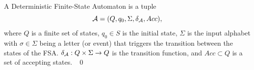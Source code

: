 \documentclass{ifacconf}
\newcommand{\red}[1]{{\color{red} #1}}
\begin{document}
% 

\begin{definition}
A Deterministic Finite-State Automaton is a tuple
 \[\mathcal{A} = (Q, q_0, \Sigma, \delta_{\mathcal{A}}, Acc),\] where %
$Q$ is a finite set of states, $q_0 \in S$ is the initial state,
$\Sigma$ is the input alphabet with $\sigma\in\Sigma$ being a letter (or event) that triggers the transition between the states of the FSA.   
$\delta_{\mathcal{A}} : Q \times \Sigma \rightarrow Q$ is the transition function, and
$Acc\subset Q$ is a set of accepting states. \hfill \mbox{ }\qed
\end{definition}
\end{document}
